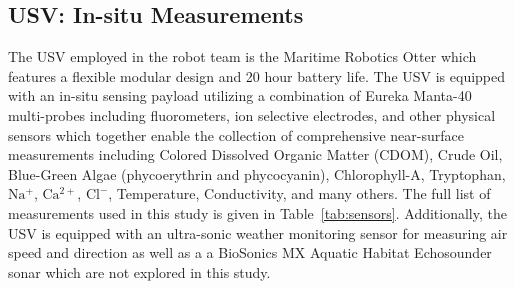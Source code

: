 \documentclass[journal,article,submit,pdftex,moreauthors]{Definitions/mdpi}
\begin{document}
\subsection{USV: In-situ Measurements}

The USV employed in the robot team is the Maritime Robotics Otter which features a flexible modular design and 20 hour battery life. The USV is equipped with an in-situ sensing payload utilizing a combination of Eureka Manta-40 multi-probes including fluorometers, ion selective electrodes, and other physical sensors which together enable the collection of comprehensive near-surface measurements including Colored Dissolved Organic Matter (CDOM), Crude Oil, Blue-Green Algae (phycoerythrin and phycocyanin), Chlorophyll-A, Tryptophan, $\mathrm{Na^+}$, $\mathrm{Ca^{2+}}$, $\mathrm{Cl^-}$, Temperature, Conductivity, and many others. The full list of measurements used in this study is given in Table~\ref{tab:sensors}. Additionally, the USV is equipped with an ultra-sonic weather monitoring sensor for measuring air speed and direction as well as a a BioSonics MX Aquatic Habitat Echosounder sonar which are not explored in this study.

\end{document}
